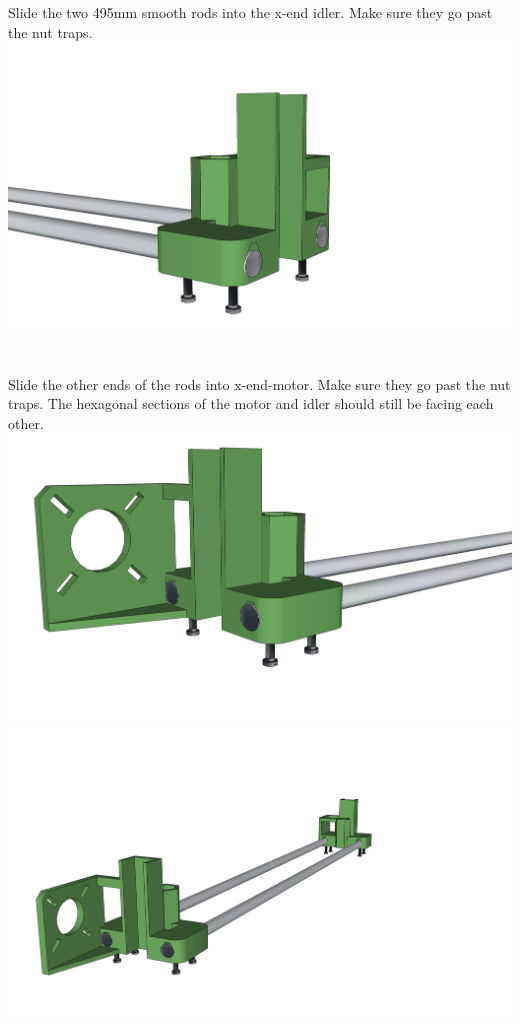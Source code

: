 \documentclass[twoside,openany,a4paper,titlepage]{memoir}
\begin{document}
	\section{}
	Slide the two 495mm smooth rods into the x-end idler. Make sure they go past the nut traps.\\
	\includegraphics[width=1\linewidth]{graphics/ch7_6.png}
	
	\section{}
	Slide the other ends of the rods into x-end-motor. Make sure they go past the nut traps. The hexagonal
	sections of the motor and idler should still be facing each other.\\
	\includegraphics[width=1\linewidth]{graphics/ch7_7_1.png}
	\includegraphics[width=1\linewidth]{graphics/ch7_7_2.png}
	
\end{document}

